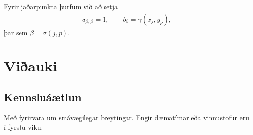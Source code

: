 \documentclass[a4paper,10pt,icelandic]{sphinxmanual}
\begin{document}
Fyrir jaðarpunkta þurfum við að setja
\begin{equation*}
\begin{split}a_{\beta,\beta }=1,  \qquad b_\beta=\gamma(x_j, y_p),\end{split}
\end{equation*}
þar sem \(\beta=\sigma(j,p)\).


\chapter{Viðauki}
\label{\detokenize{vidauki:viauki}}\label{\detokenize{vidauki::doc}}

\section{Kennsluáætlun}
\label{\detokenize{vidauki:kennsluaaetlun}}
Með fyrirvara um smávægilegar breytingar. Engir dæmatímar eða vinnustofur eru í fyrstu viku.
\end{document}
